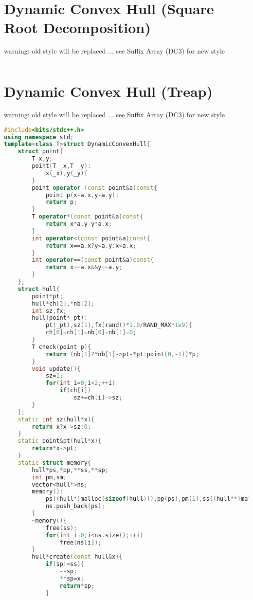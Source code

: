\documentclass{book}
\begin{document}
\section{Dynamic Convex Hull (Square Root Decomposition)}
warning: old style will be replaced ... see Suffix Array (DC3) for new style\begin{lstlisting}[language=C++,title={Dynamic Convex Hull (Square Root Decomposition).hpp (0 bytes, 0 lines)}]
\end{lstlisting}
\section{Dynamic Convex Hull (Treap)}
warning: old style will be replaced ... see Suffix Array (DC3) for new style\begin{lstlisting}[language=C++,title={Dynamic Convex Hull (Treap).hpp (9485 bytes, 327 lines)}]
#include<bits/stdc++.h>
using namespace std;
template<class T>struct DynamicConvexHull{
    struct point{
        T x,y;
        point(T _x,T _y):
            x(_x),y(_y){
        }
        point operator-(const point&a)const{
            point p(x-a.x,y-a.y);
            return p;
        }
        T operator*(const point&a)const{
            return x*a.y-y*a.x;
        }
        int operator<(const point&a)const{
            return x==a.x?y<a.y:x<a.x;
        }
        int operator==(const point&a)const{
            return x==a.x&&y==a.y;
        }
    };
    struct hull{
        point*pt;
        hull*ch[2],*nb[2];
        int sz,fx;
        hull(point*_pt):
            pt(_pt),sz(1),fx(rand()*1.0/RAND_MAX*1e9){
            ch[0]=ch[1]=nb[0]=nb[1]=0;
        }
        T check(point p){
            return (nb[1]?*nb[1]->pt-*pt:point(0,-1))*p;
        }
        void update(){
            sz=1;
            for(int i=0;i<2;++i)
                if(ch[i])
                    sz+=ch[i]->sz;
        }
    };
    static int sz(hull*x){
        return x?x->sz:0;
    }
    static point&pt(hull*x){
        return*x->pt;
    }
    static struct memory{
        hull*ps,*pp,**ss,**sp;
        int pm,sm;
        vector<hull*>ns;
        memory():
            ps((hull*)malloc(sizeof(hull))),pp(ps),pm(1),ss((hull**)malloc(sizeof(hull*))),sp(ss),sm(1){
            ns.push_back(ps);
        }
        ~memory(){
            free(ss);
            for(int i=0;i<ns.size();++i)
                free(ns[i]);
        }
        hull*create(const hull&x){
            if(sp!=ss){
                --sp;
                **sp=x;
                return*sp;
            }

\end{lstlisting}
\end{document}
